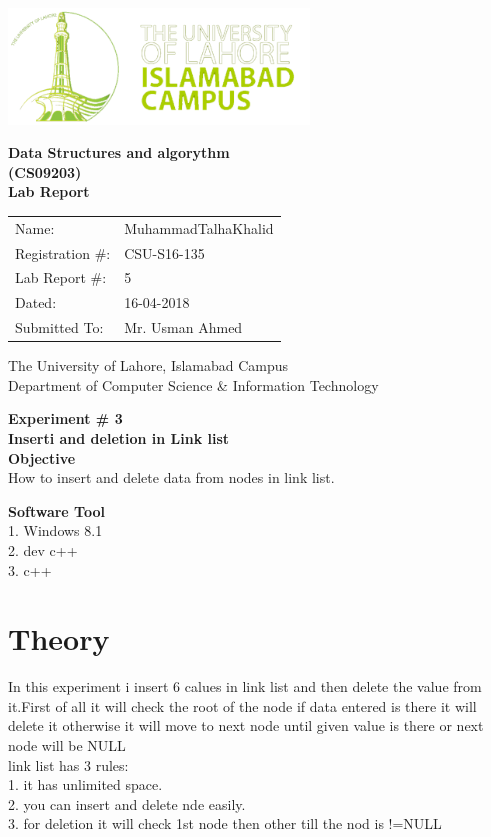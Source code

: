 \documentclass[11pt]{article}            %
\begin{document}
\begin{titlepage}
    \centering
  \vfill
    \includegraphics[width=8cm]{uni_logo.png} \\ 
	\vskip2cm
    {\bfseries\Large
	Data Structures and algorythm  \\ (CS09203)\\
	
	\vskip2cm
	Lab Report 
	 
	\vskip2cm
	}    

\begin{center}
\begin{tabular}{ l l  } 

Name: & MuhammadTalhaKhalid \\ 
Registration \#: &CSU-S16-135\\ 
Lab Report \#: &5\\ 
 Dated:& 16-04-2018\\ 
Submitted To:& Mr. Usman Ahmed\\ 

\end{tabular}
\end{center}
    \vfill
    The University of Lahore, Islamabad Campus\\
Department of Computer Science \& Information Technology
\end{titlepage}

    {\bfseries\Large
\centering
	Experiment \# 3 \\
Inserti and deletion in Link list\\
	
	}    
 \vskip1cm
 \textbf {Objective}\\  How to insert and delete data from nodes in link list.
 
 \textbf {Software Tool} \\
1. Windows 8.1 \\
2. dev c++\\
3. c++\\

\section{Theory }              
In this experiment i insert 6 calues in link list and then delete the value from it.First of all it will check the root of the node if data entered is there it will delete it otherwise it will move to next node until given value is there or next node will be NULL \\
link list  has 3  rules:\\
1.	it has unlimited space.\\
2.	you can insert and delete nde easily.\\
3.       for deletion it will check 1st node then other till the nod is !=NULL \\
\end{document}
